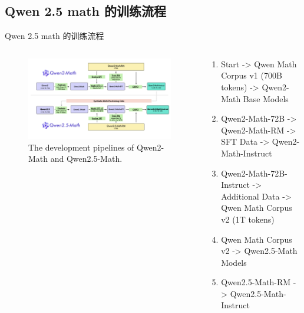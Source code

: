 \documentclass[aspectratio=169]{beamer}
\begin{document}
\subsection{Qwen 2.5 math 的训练流程}
\begin{frame}{Qwen 2.5 math 的训练流程}\small
\begin{columns}
    \begin{column}{0.6\textwidth}
        \begin{figure}[htbp]
            \centering
        \includegraphics[width=1\columnwidth]{pic/qwen2.5-math-pipeline.jpeg}
            \vspace{-1mm}
            \caption{The development pipelines of Qwen2-Math and Qwen2.5-Math. }
            \label{fig:pipeline}
        \end{figure}
    \end{column}

    \begin{column}{0.4\textwidth}
        \begin{enumerate}
            \item Start -> Qwen Math Corpus v1 (700B tokens) -> Qwen2-Math Base Models
            \item Qwen2-Math-72B -> Qwen2-Math-RM -> SFT Data -> Qwen2-Math-Instruct
            \item Qwen2-Math-72B-Instruct -> Additional Data -> Qwen Math Corpus v2 (1T tokens)
            \item Qwen Math Corpus v2 -> Qwen2.5-Math Models
            \item Qwen2.5-Math-RM -> Qwen2.5-Math-Instruct
        \end{enumerate}
    \end{column}
\end{columns}
\end{frame}
\end{document}
